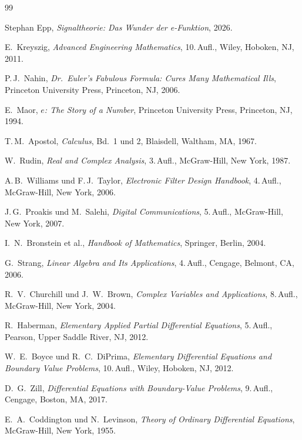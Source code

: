\documentclass[a4paper,12pt,twoside]{report}
\theoremstyle{definition}
\begin{document}
\begin{thebibliography}{99}
	
	Stephan Epp,
	\textit{Signaltheorie: Das Wunder der e-Funktion},
	2026.
	
	E.~Kreyszig,
	\textit{Advanced Engineering Mathematics},
	10.\,Aufl., Wiley, Hoboken, NJ, 2011.
	
	P.\,J.~Nahin,
	\textit{Dr.\ Euler's Fabulous Formula: Cures Many Mathematical Ills},
	Princeton University Press, Princeton, NJ, 2006.
	
	E.~Maor,
	\textit{$e$: The Story of a Number},
	Princeton University Press, Princeton, NJ, 1994.
	
	T.\,M.~Apostol,
	\textit{Calculus}, Bd.~1 und 2,
	Blaisdell, Waltham, MA, 1967.
	
	W.~Rudin,
	\textit{Real and Complex Analysis},
	3.\,Aufl., McGraw-Hill, New York, 1987.
	
	A.\,B.~Williams und F.\,J.~Taylor,
	\textit{Electronic Filter Design Handbook},
	4.\,Aufl., McGraw-Hill, New York, 2006.
	
	J.\,G.~Proakis und M.~Salehi,
	\textit{Digital Communications},
	5.\,Aufl., McGraw-Hill, New York, 2007.

	I.~N.~Bronstein et al.,
	\textit{Handbook of Mathematics},
	Springer, Berlin, 2004.

	G.~Strang,
	\textit{Linear Algebra and Its Applications},
	4.\,Aufl., Cengage, Belmont, CA, 2006.

	R.~V.~Churchill und J.~W.~Brown,
	\textit{Complex Variables and Applications},
	8.\,Aufl., McGraw-Hill, New York, 2004.

	R.~Haberman,
	\textit{Elementary Applied Partial Differential Equations},
	5.\,Aufl., Pearson, Upper Saddle River, NJ, 2012.

	W.~E.~Boyce und R.~C.~DiPrima,
	\textit{Elementary Differential Equations and Boundary Value Problems},
	10.\,Aufl., Wiley, Hoboken, NJ, 2012.

	D.~G.~Zill,
	\textit{Differential Equations with Boundary-Value Problems},
	9.\,Aufl., Cengage, Boston, MA, 2017.

	E.~A.~Coddington und N.~Levinson,
	\textit{Theory of Ordinary Differential Equations},
	McGraw-Hill, New York, 1955.


\end{thebibliography}
\end{document}
